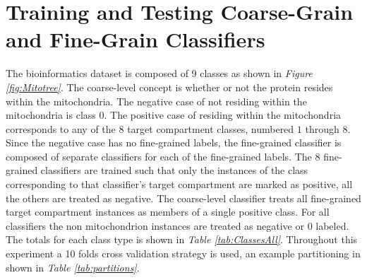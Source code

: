 \documentclass[ms]{nuthesis}
\begin{document}
\section{Training and Testing Coarse-Grain and Fine-Grain Classifiers}
\par The bioinformatics dataset is composed of 9 classes as shown in
\textit{Figure \ref{fig:Mitotree}}. The coarse-level concept is whether or not
the protein resides within the mitochondria. The negative case of not residing within the mitochondria is class $0$.
The positive case of residing within the
  mitochondria corresponds to any of the $8$ target compartment classes,  numbered $1$ through $8$. Since the
  negative case has no fine-grained labels, the fine-grained classifier is composed of separate classifiers
  for each of the fine-grained labels. The $8$ fine-grained classifiers are trained such that only the instances of
  the class corresponding to that classifier's target compartment are marked as positive, all the others are treated
  as negative. The coarse-level classifier treats all fine-grained target compartment
  instances as members of a single positive class. For all classifiers the non mitochondrion instances are treated as
  negative or $0$ labeled. The totals for each class type is shown in \textit{Table \ref{tab:ClassesAll}}. Throughout
  this experiment a 10 folds cross validation strategy is used, an example partitioning in shown in
  \textit{Table \ref{tab:partitions}}.
\end{document}
